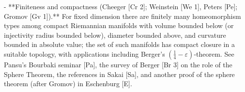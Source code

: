 - **Finiteness and compactness (Cheeger [Cr 2]; Weinstein [We 1], Peters [Pe]; Gromov
  [Gv 1]).** For fixed dimension there are finitely many homeomorphism types among
  compact Riemannian manifolds with volume bounded below (or injectivity radius
  bounded below), diameter bounded above, and curvature bounded in absolute value; the
  set of such manifolds has compact closure in a suitable topology, with applications
  including Berger's $(\tfrac14-\varepsilon)$-theorem. See Pansu's Bourbaki seminar
  [Pa], the survey of Berger [Br 3] on the role of the Sphere Theorem, the references
  in Sakai [Sa], and another proof of the sphere theorem (after Gromov) in Eschenburg
  [E].
